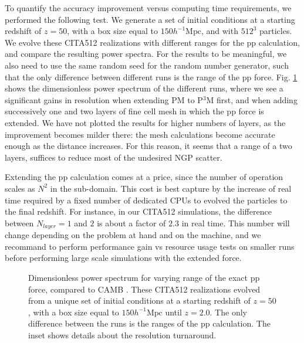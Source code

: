  
 
 To quantify the accuracy improvement versus computing time requirements, we performed the following test.
 We generate a set of initial conditions at a starting redshift of $z = 50$, with a box size equal to $ 150 h^{-1}\mbox{Mpc}$,
 and with $512^{3}$ particles. We evolve these CITA512 realizations with different ranges for the pp calculation, and compare 
 the resulting power spectra. For the results to be meaningful, we also need to use the same random seed for the random number generator,
 such that the only difference between different runs is the range of the pp force.
 Fig. \ref{fig:power} shows the dimensionless power spectrum of the different runs, where we see a significant gains in resolution
 when extending  PM to P$^{3}$M first, and when adding successively one and two layers of fine cell mesh in which the pp force is extended.
We have not plotted the results for higher numbers of layers, as the improvement becomes milder there: the mesh calculations
become accurate enough as the distance increases. For this reason, it seems that a range of a two layers, suffices 
to reduce most of the undesired NGP scatter.

Extending the pp calculation comes at a price, since the number of operation scales as  $N^{2}$ in the sub-domain. 
This cost is best capture by the increase of real time required by a fixed number of dedicated  {\small CPU}s 
to evolved the particles to the final redshift. For instance, in our CITA512 simulations, 
the difference between $N_{layer} = 1$ and $2$ is about a factor of $2.3$ in real time.
This number will change depending on the problem at hand and on the machine, and we recommand
to perform performance gain vs resource usage tests on smaller runs before performing large scale simulations
with the extended force.


\begin{figure}
  \begin{center}
  \caption{ Dimensionless power spectrum for varying range of the exact pp force, compared to  {\small CAMB} \citep{Lewis:1999bs}.
  These CITA512 realizations evolved from a unique set of initial conditions at a starting redshift of $z = 50$, with a box size equal to $ 150 h^{-1}\mbox{Mpc}$ 
  until $z=2.0$. The only difference between the runs is the ranges of the pp calculation. The inset shows details about the resolution turnaround. }
    \label{fig:power}
  \end{center}
\end{figure}


